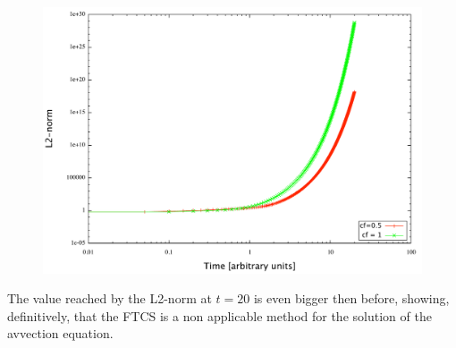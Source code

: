 \documentclass[11pt,a4paper]{article}
\begin{document}
\begin{figure}[!h]
\centering
{\includegraphics[scale=0.4]{L2norm_ftcs_sw}}
\end{figure}
The value reached by the L2-norm at $t=20$ is even bigger then before, showing, definitively, that the FTCS is a non applicable method for the solution of the avvection equation. 
\end{document}
